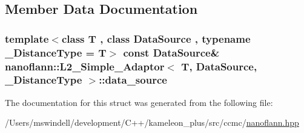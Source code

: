 \subsection{Member Data Documentation}
\hypertarget{structnanoflann_1_1_l2___simple___adaptor_a43d73454c22f2006e21a7186a67a9537}{
\subsubsection[{data\-\_\-source}]{\setlength{\rightskip}{0pt plus 5cm}template$<$class T , class Data\-Source , typename \-\_\-\-Distance\-Type  = T$>$ const Data\-Source\& {\bf nanoflann\-::\-L2\-\_\-\-Simple\-\_\-\-Adaptor}$<$ T, Data\-Source, \-\_\-\-Distance\-Type $>$\-::data\-\_\-source}}\label{structnanoflann_1_1_l2___simple___adaptor_a43d73454c22f2006e21a7186a67a9537}


The documentation for this struct was generated from the following file\-:\begin{DoxyCompactItemize}
\item 
/\-Users/mswindell/development/\-C++/kameleon\-\_\-plus/src/ccmc/\hyperlink{nanoflann_8hpp}{nanoflann.\-hpp}\end{DoxyCompactItemize}
